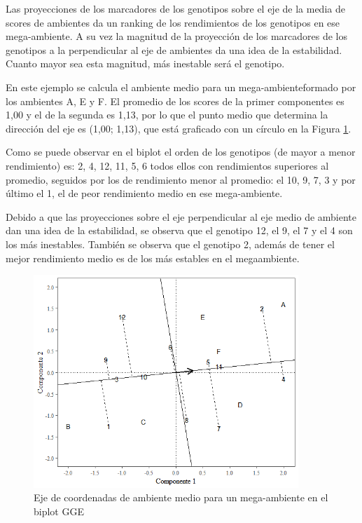 Las proyecciones de los marcadores de los genotipos sobre el eje de la media de scores de ambientes da un ranking de los rendimientos de los genotipos en ese mega-ambiente. A su vez la magnitud de la proyección de los marcadores de los genotipos a la perpendicular al eje de ambientes da una idea de la estabilidad. Cuanto mayor sea esta magnitud, más inestable será el genotipo.

En este ejemplo se calcula el ambiente medio para un mega-ambienteformado por los ambientes A, E y F. El promedio de los scores de la primer componentes es 1,00 y el de la segunda es 1,13, por lo que el punto medio que determina la dirección del eje es (1,00; 1,13), que está graficado con un círculo en la Figura \ref{fig:fig316}.

Como se puede observar en el biplot el orden de los genotipos (de mayor a menor rendimiento) es: 2, 4, 12, 11, 5, 6 todos ellos con rendimientos superiores al promedio, seguidos por los de rendimiento menor al promedio: el 10, 9, 7, 3 y por último el 1, el de peor rendimiento medio en ese mega-ambiente.

Debido a que las proyecciones sobre el eje perpendicular al eje medio de ambiente dan una idea de la estabilidad, se observa que el genotipo 12, el 9, el 7 y el 4 son los más inestables. También se observa que el genotipo 2, además de tener el mejor rendimiento medio es de los más estables en el megaambiente.


\begin{figure}[h!]
	\begin{center}
		\includegraphics[width=10cm]{./Graficos/mean_stab_GGE.png}
	\end{center}
	\caption{Eje de coordenadas de ambiente medio para un mega-ambiente en el biplot GGE}
	\label{fig:fig316}
\end{figure}



